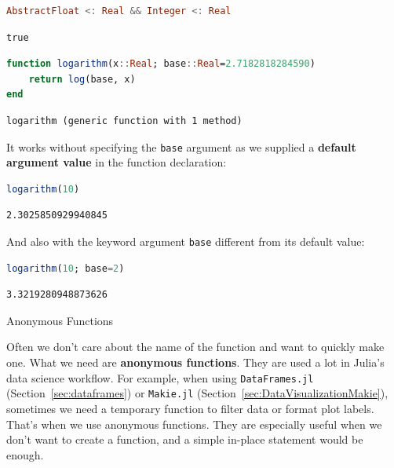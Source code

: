 \documentclass[
  notoc %
]{tufte-book}
\makeatletter
\newcommand{\passthrough}[1]{#1}
\renewcommand\subsubsection{%
\@startsection{subsubsection}{3}{\z@ }{-3.25ex\@plus -1ex \@minus -.2ex}{1.5ex \@plus .2ex}{\normalfont \normalsize \bfseries }
}
\makeatother
\begin{document}
\begin{lstlisting}[language=Julia]
AbstractFloat <: Real && Integer <: Real
\end{lstlisting}

\begin{lstlisting}[language=Output]
true
\end{lstlisting}

\begin{lstlisting}[language=Julia]
function logarithm(x::Real; base::Real=2.7182818284590)
    return log(base, x)
end
\end{lstlisting}

\begin{lstlisting}[language=Output]
logarithm (generic function with 1 method)
\end{lstlisting}

It works without specifying the \passthrough{\lstinline!base!} argument
as we supplied a \textbf{default argument value} in the function
declaration:

\begin{lstlisting}[language=Julia]
logarithm(10)
\end{lstlisting}

\begin{lstlisting}[language=Output]
2.3025850929940845
\end{lstlisting}

And also with the keyword argument \passthrough{\lstinline!base!}
different from its default value:

\begin{lstlisting}[language=Julia]
logarithm(10; base=2)
\end{lstlisting}

\begin{lstlisting}[language=Output]
3.3219280948873626
\end{lstlisting}

\hypertarget{sec:function_anonymous}{%
\subsubsection{Anonymous Functions}\label{sec:function_anonymous}}

Often we don't care about the name of the function and want to quickly
make one. What we need are \textbf{anonymous functions}. They are used a
lot in Julia's data science workflow. For example, when using
\passthrough{\lstinline!DataFrames.jl!} (Section~\ref{sec:dataframes})
or \passthrough{\lstinline!Makie.jl!}
(Section~\ref{sec:DataVisualizationMakie}), sometimes we need a
temporary function to filter data or format plot labels. That's when we
use anonymous functions. They are especially useful when we don't want
to create a function, and a simple in-place statement would be enough.
\end{document}
